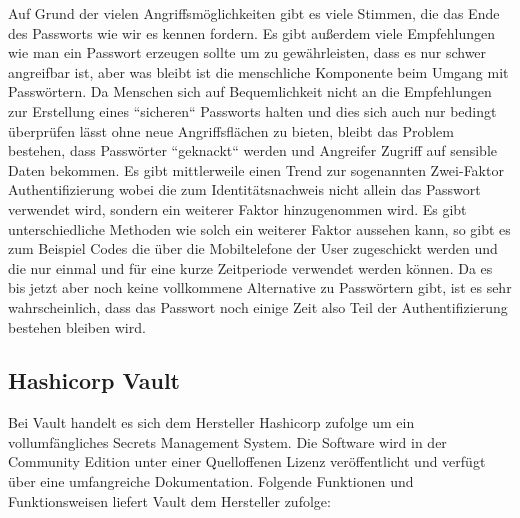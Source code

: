 \documentclass[
a4paper,   
titlepage,  
halfparskip,
12pt        
]{scrartcl}
\begin{document}
\begin{onehalfspacing}
Auf Grund der vielen Angriffsmöglichkeiten gibt es viele Stimmen, die das Ende des Passworts wie wir es kennen fordern. Es gibt außerdem viele Empfehlungen wie man ein Passwort erzeugen sollte um zu gewährleisten, dass es nur schwer angreifbar ist, aber was bleibt ist die menschliche Komponente beim Umgang mit Passwörtern. Da Menschen sich auf Bequemlichkeit nicht an die Empfehlungen zur Erstellung eines ``sicheren`` Passworts halten und dies sich auch nur bedingt überprüfen lässt ohne neue Angriffsflächen zu bieten, bleibt das Problem bestehen, dass Passwörter ``geknackt`` werden und Angreifer Zugriff auf sensible Daten bekommen. Es gibt mittlerweile einen Trend zur sogenannten Zwei-Faktor Authentifizierung wobei die zum Identitätsnachweis nicht allein das Passwort verwendet wird, sondern ein weiterer Faktor hinzugenommen wird. Es gibt unterschiedliche Methoden wie solch ein weiterer Faktor aussehen kann, so gibt es zum Beispiel Codes die über die Mobiltelefone der User zugeschickt werden und die nur einmal und für eine kurze Zeitperiode verwendet werden können. Da es bis jetzt aber noch keine vollkommene Alternative zu Passwörtern gibt, ist es sehr wahrscheinlich, dass das Passwort noch einige Zeit also Teil der Authentifizierung bestehen bleiben wird.\cite{pass}
\subsection{Hashicorp Vault}

Bei Vault handelt es sich dem Hersteller Hashicorp zufolge um ein vollumfängliches Secrets Management System. Die Software wird in der Community Edition unter einer Quelloffenen Lizenz veröffentlicht und verfügt über eine umfangreiche Dokumentation. Folgende Funktionen und Funktionsweisen liefert Vault dem Hersteller zufolge:


\end{onehalfspacing}
\end{document}
